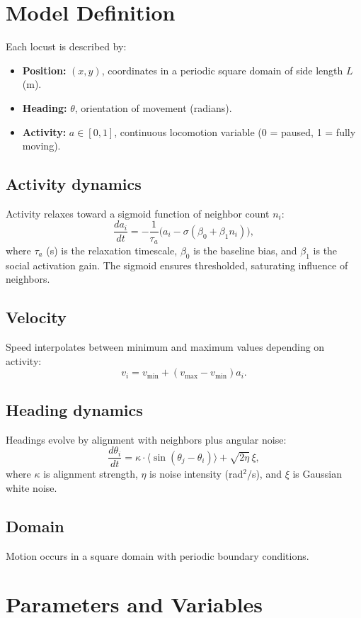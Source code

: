 \documentclass[11pt,a4paper]{article}
\begin{document}
\section{Model Definition}

Each locust is described by:
\begin{itemize}
    \item \textbf{Position:} $(x,y)$, coordinates in a periodic square domain of side length $L$ (m).
    \item \textbf{Heading:} $\theta$, orientation of movement (radians).
    \item \textbf{Activity:} $a \in [0,1]$, continuous locomotion variable (0 = paused, 1 = fully moving).
\end{itemize}

\subsection{Activity dynamics}
Activity relaxes toward a sigmoid function of neighbor count $n_i$:
\[
\frac{da_i}{dt} = -\frac{1}{\tau_a}\Big(a_i - \sigma(\beta_0 + \beta_1 n_i)\Big),
\]
where $\tau_a$ (s) is the relaxation timescale, $\beta_0$ is the baseline bias, and $\beta_1$ is the social activation gain. The sigmoid ensures thresholded, saturating influence of neighbors.

\subsection{Velocity}
Speed interpolates between minimum and maximum values depending on activity:
\[
v_i = v_{\min} + (v_{\max} - v_{\min}) a_i.
\]

\subsection{Heading dynamics}
Headings evolve by alignment with neighbors plus angular noise:
\[
\frac{d\theta_i}{dt} = \kappa \cdot \langle \sin(\theta_j - \theta_i)\rangle + \sqrt{2\eta}\,\xi,
\]
where $\kappa$ is alignment strength, $\eta$ is noise intensity (rad$^2$/s), and $\xi$ is Gaussian white noise.

\subsection{Domain}
Motion occurs in a square domain with periodic boundary conditions.

\section{Parameters and Variables}
\end{document}
